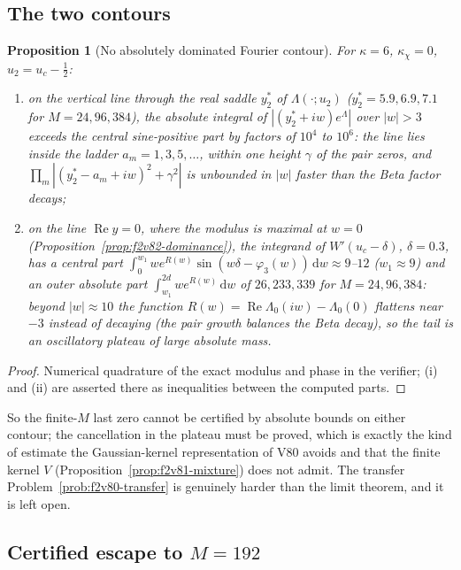 \documentclass[11pt]{article}
\newtheorem{proposition}[theorem]{Proposition}
\theoremstyle{definition}
\theoremstyle{remark}
\newcommand{\dd}{\,\mathrm d}
\begin{document}
\subsection{The two contours}

\begin{proposition}[No absolutely dominated Fourier contour]
\label{prop:f2v84-contours}
For \(\kappa=6\), \(\kappa_\chi=0\), \(u_2=u_c-\tfrac12\):
\begin{enumerate}[label=\textup{(\roman*)}]
\item on the vertical line through the real saddle \(y_2^*\) of
\(\Lambda(\cdot;u_2)\) (\(y_2^*=5.9,6.9,7.1\) for \(M=24,96,384\)), the
absolute integral of \(|(y_2^*+iw)e^{\Lambda}|\) over \(|w|>3\) exceeds the
central sine-positive part by factors of \(10^4\) to \(10^6\): the line
lies inside the ladder \(a_m=1,3,5,\dots\), within one height \(\gamma\)
of the pair zeros, and \(\prod_m|(y_2^*-a_m+iw)^2+\gamma^2|\) is unbounded
in \(|w|\) faster than the Beta factor decays;
\item on the line \(\operatorname{Re}y=0\), where the modulus is maximal
at \(w=0\) (Proposition~\ref{prop:f2v82-dominance}), the integrand of
\(W'(u_c-\delta)\), \(\delta=0.3\), has a central part
\(\int_0^{w_1}we^{R(w)}\sin(w\delta-\varphi_3(w))\dd w\approx9\)--\(12\)
(\(w_1\approx9\)) and an outer absolute part \(\int_{w_1}^{2d}we^{R(w)}\dd w\)
of \(26,233,339\) for \(M=24,96,384\): beyond \(|w|\approx10\) the
function \(R(w)=\operatorname{Re}\Lambda_0(iw)-\Lambda_0(0)\) flattens near
\(-3\) instead of decaying (the pair growth balances the Beta decay), so
the tail is an oscillatory plateau of large absolute mass.
\end{enumerate}
\end{proposition}

\begin{proof}
Numerical quadrature of the exact modulus and phase in the verifier;
(i) and (ii) are asserted there as inequalities between the computed
parts.
\end{proof}

So the finite-\(M\) last zero cannot be certified by absolute bounds on
either contour; the cancellation in the plateau must be proved, which is
exactly the kind of estimate the Gaussian-kernel representation of V80
avoids and that the finite kernel \(V\) (Proposition~\ref{prop:f2v81-mixture})
does not admit.  The transfer Problem~\ref{prob:f2v80-transfer} is
genuinely harder than the limit theorem, and it is left open.

\subsection{Certified escape to \(M=192\)}
\end{document}
